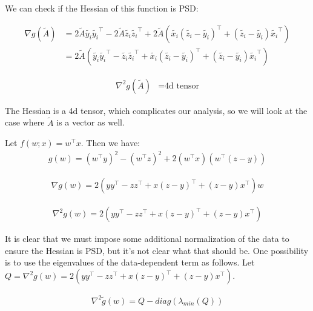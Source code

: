 \documentclass[11pt]{article}
\begin{document}
We can check if the Hessian of this function is PSD:

\begin{align*}
\nabla{g(\tilde{A})}
&= 2\tilde{A}\tilde{y_i}\tilde{y_i}^\top - 2\tilde{A}\tilde{z_i}\tilde{z_i}^\top + 2\tilde{A}(\tilde{x_i}(\tilde{z_i} - \tilde{y_i})^\top + (\tilde{z_i} - \tilde{y_i})\tilde{x_i}^\top) \\
&= 2\tilde{A}(\tilde{y_i}\tilde{y_i}^\top - \tilde{z_i}\tilde{z_i}^\top + \tilde{x_i}(\tilde{z_i} - \tilde{y_i})^\top + (\tilde{z_i} - \tilde{y_i})\tilde{x_i}^\top)
\end{align*}

\begin{equation}
\begin{aligned}
\nabla^2 g(\tilde{A})
&= \textrm{4d tensor}
\end{aligned}
\end{equation}

The Hessian is a 4d tensor, which complicates our analysis, so we will look at the case where $\tilde{A}$ is a vector as well. 

Let $f(w; x) = w^{\top}x$. Then we have:
\begin{equation}
\begin{aligned}
g(w) = (w^{\top}y)^2 - (w^{\top}z)^2 + 2(w^{\top}x)(w^{\top}(z - y))
\end{aligned}
\end{equation}

\begin{equation}
\begin{aligned}
\nabla g(w) = 2(yy^{\top} - zz^{\top} + x(z - y)^{\top} + (z - y)x^{\top})w
\end{aligned}
\end{equation}

\begin{equation}
\begin{aligned}
\nabla^2 g(w) = 2(yy^{\top} - zz^{\top} + x(z - y)^{\top} + (z - y)x^{\top})
\end{aligned}
\end{equation}

It is clear that we must impose some additional normalization of the data to ensure the Hessian is PSD, but it's not clear what that should be. One possibility is to use the eigenvalues of the data-dependent term as follows. Let $Q = \nabla^2 g(w) = 2(yy^{\top} - zz^{\top} + x(z - y)^{\top} + (z - y)x^{\top})$. 

\begin{equation}
\begin{aligned}
\nabla^2 \tilde{g}(w) = Q - diag(\lambda_{min}(Q))
\end{aligned}
\end{equation}
\end{document}
